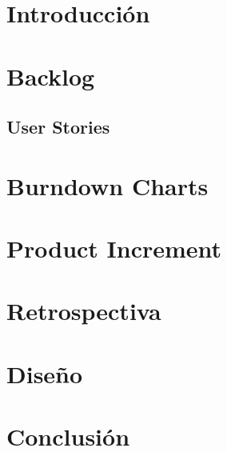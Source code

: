 \documentclass[10pt,a4paper]{article}
\begin{document}
\begin{comment}
\hline \hline
\multirow{3}{2cm}{Registrarme} & Crear entorno de programacion & 2 & \\ \cline{2-4}
& Verificar datos y agregarlos a la base de datos & 5 & \\ \cline{2-4}
& Crear interfaz grafica & 2 & 9\\ \cline{1-4}
\hline \hline
\multirow{3}{2cm}{Loguearme} & Crear entorno de programacion & 2 & \\ \cline{2-4}
& Verificar datos & 1 & \\ \cline{2-4}
& Crear interfaz grafica & 1 & 4\\ \cline{1-4}
\hline \hline
\multirow{3}{2cm}{Eliminar bar} & Crear entorno de programacion & 2 & \\ \cline{2-4}
& Verificar datos del bar& 1 & \\ \cline{2-4}
& Verificar datos del usuario& 1 & \\ \cline{2-4}
& Eliminar datos de la base de datos& 5 & \\ \cline{2-4}
& Crear interfaz grafica & 3 & 13\\ \cline{1-4}

\end{tabular}
\end{center}
\end{table}
\end{comment}

\section{Introducción}


\section{Backlog}


\subsection{User Stories}


\section{Burndown Charts}


\section{Product Increment}


\section{Retrospectiva}


\section{Diseño}


\section{Conclusión}

\end{document}

